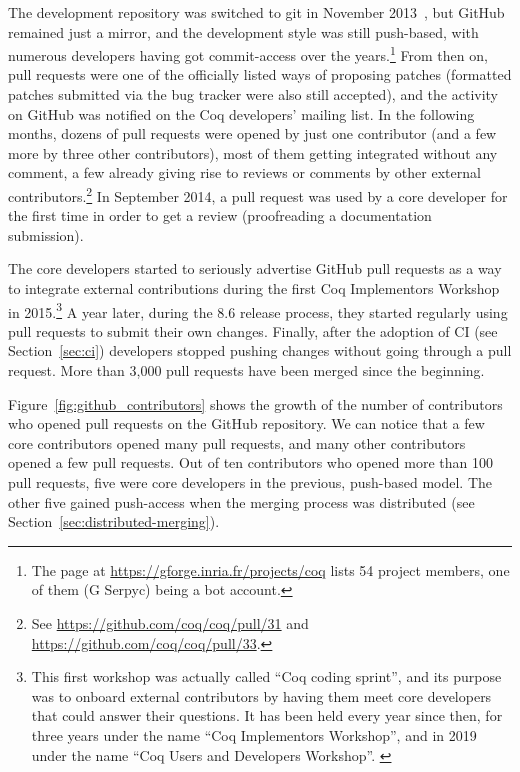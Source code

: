 The development repository was switched to git in November 2013~\cite{letouzey_svn_to_git}, but GitHub remained just a mirror, and the development style was still push-based, with numerous developers having got commit-access over the years.\footnote{ \label{footnote:forge}
	The page at \url{https://gforge.inria.fr/projects/coq} lists 54 project members, one of them (G Serpyc) being a bot account.
}
From then on, pull requests were one of the officially listed ways of proposing patches (formatted patches submitted via the bug tracker were also still accepted), and the activity on GitHub was notified on the Coq developers' mailing list.
In the following months, dozens of pull requests were opened by just one contributor (and a few more by three other contributors), most of them getting integrated without any comment, a few already giving rise to reviews or comments by other external contributors.\footnote{
	See \url{https://github.com/coq/coq/pull/31} and \url{https://github.com/coq/coq/pull/33}.
}
In September 2014, a pull request was used by a core developer for the first time in order to get a review (proofreading a documentation submission).

The core developers started to seriously advertise GitHub pull requests as a way to integrate external contributions during the first Coq Implementors Workshop in 2015.\footnote{
	This first workshop was actually called ``Coq coding sprint'', and its purpose was to onboard external contributors by having them meet core developers that could answer their questions. It has been held every year since then, for three years under the name ``Coq Implementors Workshop'', and in 2019 under the name ``Coq Users and Developers Workshop''.
	\label{footnote:coq_implementors_workshop}
}
A year later, during the 8.6 release process, they started regularly using pull requests to submit their own changes.
Finally, after the adoption of CI (see Section~\ref{sec:ci}) developers stopped pushing changes without going through a pull request.
More than 3,000 pull requests have been merged since the beginning.

Figure~\ref{fig:github_contributors} shows the growth of the number of contributors who opened pull requests on the GitHub repository. We can notice that a few core contributors opened many pull requests, and many other contributors opened a few pull requests.
Out of ten contributors who opened more than 100 pull requests, five were core developers in the previous, push-based model. The other five gained push-access when the merging process was distributed (see Section~\ref{sec:distributed-merging}).

